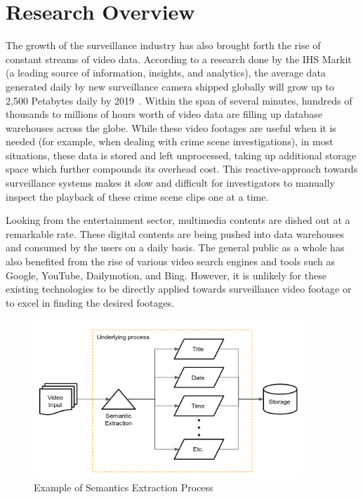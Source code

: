 \section{Research Overview}
\label{section:introduction}

The growth of the surveillance industry has also brought forth the rise of constant streams of video data. According to a research done by the IHS Markit (a leading source of information, insights, and analytics), the average data generated daily by new surveillance camera shipped globally will grow up to 2,500 Petabytes daily by 2019~\cite{woodhouse2016big}.
Within the span of several minutes, hundreds of thousands %
to millions of hours worth of video data are filling up database warehouses across the globe.
While these video footages are useful when it is needed (for example, when dealing with crime scene investigations), in most situations, these data is stored and left unprocessed, taking up additional storage space which further compounds its overhead cost.
This reactive-approach towards surveillance systems makes it slow and difficult for investigators to manually inspect the playback of these crime scene clips one at a time.

Looking from the entertainment sector, multimedia contents are dished out at a remarkable rate. These digital contents are being pushed into data warehouses and consumed by the users on a daily basis. The general public as a whole has also benefited from the rise of various video search engines and tools such as Google, YouTube, Dailymotion, and Bing. However, it is unlikely for these existing technologies to be directly applied towards surveillance video footage or to excel in finding the desired footages.

\begin{figure}[!hbt]\centering
\includegraphics[width=0.9\textwidth]{image/general/simpleframe3.png}
\caption{Example of Semantics Extraction Process}
\label{fig:exampleframework2}
\end{figure}


